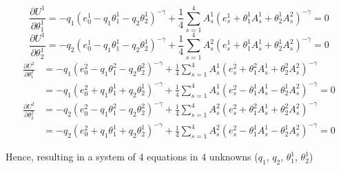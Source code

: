 \documentclass[letterpaper,12pt]{article}
\theoremstyle{definition}
\begin{document}
\begin{equation}
	\frac{\partial U^1}{\partial \theta_1^1} = -q_1(e_0^1 - q_1\theta_1^1 - q_2\theta_2^1)^{-\gamma} + \frac{1}{4}\sum_{s=1}^{4} A_s^1(e_s^1 + \theta_1^1 A_s^1 + \theta_2^1 A_s^2)^{-\gamma} = 0
\end{equation}
\begin{equation}
	\frac{\partial U^1}{\partial \theta_2^1} = -q_2(e_0^1 - q_1\theta_1^1 - q_2\theta_2^1)^{-\gamma} + \frac{1}{4}\sum_{s=1}^{4} A_s^2(e_s^1 + \theta_1^1 A_s^1 + \theta_2^1 A_s^2)^{-\gamma} = 0
\end{equation}
\begin{align}
	\frac{\partial U^2}{\partial \theta_1^2} &= -q_1(e_0^2 - q_1\theta_1^2 - q_2\theta_2^2)^{-\gamma} + \frac{1}{4}\sum_{s=1}^{4} A_s^1(e_s^2 + \theta_1^2 A_s^1 + \theta_2^2 A_s^2)^{-\gamma} \nonumber \\
	&= -q_1(e_0^2 + q_1\theta_1^1 + q_2\theta_2^1)^{-\gamma} + \frac{1}{4}\sum_{s=1}^{4} A_s^1(e_s^2 - \theta_1^1 A_s^1 - \theta_2^1 A_s^2)^{-\gamma} = 0
\end{align}
\begin{align}
	\frac{\partial U^2}{\partial \theta_2^2} &= -q_2(e_0^2 - q_1\theta_1^2 - q_2\theta_2^2)^{-\gamma} + \frac{1}{4}\sum_{s=1}^{4} A_s^2(e_s^2 + \theta_1^2 A_s^1 + \theta_2^2 A_s^2)^{-\gamma} \nonumber \\
	&= -q_2(e_0^2 + q_1\theta_1^1 + q_2\theta_2^1)^{-\gamma} + \frac{1}{4}\sum_{s=1}^{4} A_s^2(e_s^2 - \theta_1^1 A_s^1 - \theta_2^1 A_s^2)^{-\gamma} = 0
\end{align}

\noindent Hence, resulting in a system of 4 equations in 4 unknowns ($q_1$, $q_2$, $\theta_1^1$, $\theta_2^1$)
\end{document}
